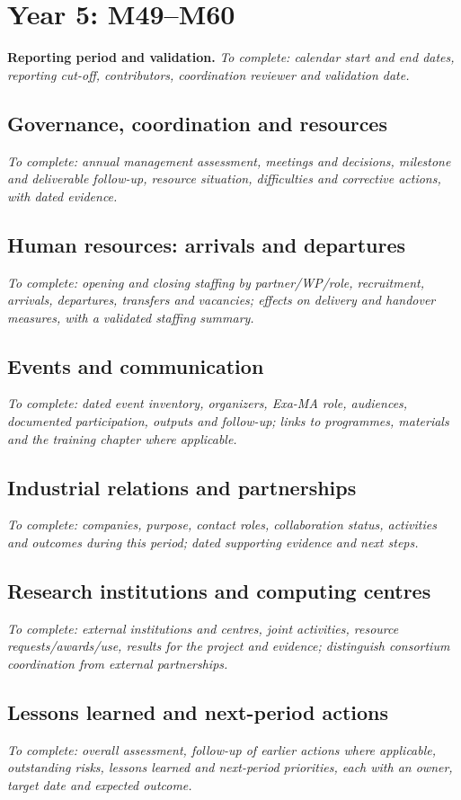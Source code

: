 \clearpage
\section{Year 5: M49--M60}
\label{sec:management-year-5}

\textbf{Reporting period and validation.}
\emph{To complete: calendar start and end dates, reporting cut-off, contributors,
coordination reviewer and validation date.}

\subsection{Governance, coordination and resources}
\emph{To complete: annual management assessment, meetings and decisions,
milestone and deliverable follow-up, resource situation, difficulties and
corrective actions, with dated evidence.}

\subsection{Human resources: arrivals and departures}
\emph{To complete: opening and closing staffing by partner/WP/role, recruitment,
arrivals, departures, transfers and vacancies; effects on delivery and handover
measures, with a validated staffing summary.}

\subsection{Events and communication}
\emph{To complete: dated event inventory, organizers, Exa-MA role, audiences,
documented participation, outputs and follow-up; links to programmes, materials
and the training chapter where applicable.}

\subsection{Industrial relations and partnerships}
\emph{To complete: companies, purpose, contact roles, collaboration status,
activities and outcomes during this period; dated supporting evidence and
next steps.}

\subsection{Research institutions and computing centres}
\emph{To complete: external institutions and centres, joint activities,
resource requests/awards/use, results for the project and evidence;
distinguish consortium coordination from external partnerships.}

\subsection{Lessons learned and next-period actions}
\emph{To complete: overall assessment, follow-up of earlier actions where
applicable, outstanding risks, lessons learned and next-period priorities,
each with an owner, target date and expected outcome.}
